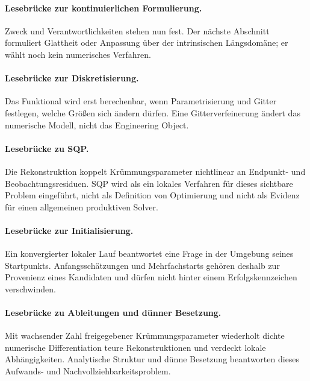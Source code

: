 

\paragraph{Lesebrücke zur kontinuierlichen Formulierung.}
Zweck und Verantwortlichkeiten stehen nun fest. Der nächste Abschnitt
formuliert Glattheit oder Anpassung über der intrinsischen Längsdomäne; er
wählt noch kein numerisches Verfahren.


\paragraph{Lesebrücke zur Diskretisierung.}
Das Funktional wird erst berechenbar, wenn Parametrisierung und Gitter
festlegen, welche Größen sich ändern dürfen. Eine Gitterverfeinerung ändert das
numerische Modell, nicht das Engineering Object.


\paragraph{Lesebrücke zu SQP.}
Die Rekonstruktion koppelt Krümmungsparameter nichtlinear an Endpunkt- und
Beobachtungsresiduen. SQP wird als ein lokales Verfahren für dieses sichtbare
Problem eingeführt, nicht als Definition von Optimierung und nicht als Evidenz
für einen allgemeinen produktiven Solver.


\paragraph{Lesebrücke zur Initialisierung.}
Ein konvergierter lokaler Lauf beantwortet eine Frage in der Umgebung seines
Startpunkts. Anfangsschätzungen und Mehrfachstarts gehören deshalb zur
Provenienz eines Kandidaten und dürfen nicht hinter einem Erfolgskennzeichen
verschwinden.


\paragraph{Lesebrücke zu Ableitungen und dünner Besetzung.}
Mit wachsender Zahl freigegebener Krümmungsparameter wiederholt dichte
numerische Differentiation teure Rekonstruktionen und verdeckt lokale
Abhängigkeiten. Analytische Struktur und dünne Besetzung beantworten dieses
Aufwands- und Nachvollziehbarkeitsproblem.


